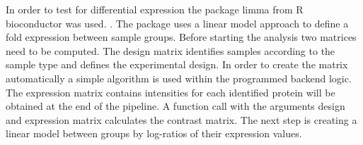\documentclass[
]{article}
\begin{document}
In order to test for differential expression the package limma from R
bioconductor was used. \citep{Phipson2016}. The package uses a linear
model approach to define a fold expression between sample groups. Before
starting the analysis two matrices need to be computed. The design
matrix identifies samples according to the sample type and defines the
experimental design. In order to create the matrix automatically a
simple algorithm is used within the programmed backend logic. The
expression matrix contains intensities for each identified protein will
be obtained at the end of the pipeline. A function call with the
arguments design and expression matrix calculates the contrast matrix.
The next step is creating a linear model between groups by log-ratios of
their expression values.
\end{document}
